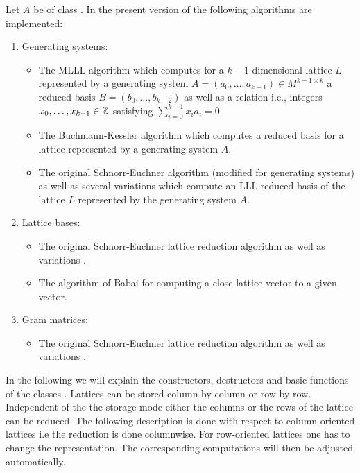 Let $A$ be of class .  In the present version of \LiDIA the following
algorithms are implemented:
\begin{enumerate}
\item Generating systems:
  \begin{itemize}
  \item The MLLL algorithm \cite{Pohst/Zassenhaus:1989} which computes for a $k-1$-dimensional
    lattice $L$ represented by a generating system $A = (a_0, \dots, a_{k-1}) \in M^{k-1 \times
      k}$ a reduced basis $B = (b_0, \dots, b_{k-2})$ as well as a relation i.e., integers $x_0,
    \dots , x_{k-1} \in \mathbb{Z}$ satisfying $\sum_{i=0}^{k-1} x_i a_i = 0$.
  \item The Buchmann-Kessler algorithm \cite{Buchmann/Kessler:1992} which computes a reduced
    basis for a lattice represented by a generating system $A$.
  \item The original Schnorr-Euchner algorithm \cite{Schnorr/Euchner:1994} (modified for
    generating systems) as well as several variations \cite{Wetzel/Backes:2000} which compute an
    LLL reduced basis of the lattice $L$ represented by the generating system $A$.
  \end{itemize}
\item Lattice bases:
  \begin{itemize}
  \item The original Schnorr-Euchner lattice reduction algorithm \cite{Schnorr/Euchner:1994} as
    well as variations \cite{Wetzel/Backes:2000}.
  \item The algorithm of Babai \cite{Babai:1986} for computing a close lattice vector to a given
    vector.
  \end{itemize}
\item Gram matrices:
  \begin{itemize}
  \item The original Schnorr-Euchner lattice reduction algorithm \cite{Schnorr/Euchner:1994} as
    well as variations \cite{Wetzel/Backes:2000}.
  \end{itemize}
\end{enumerate}
In the following we will explain the constructors, destructors and basic functions of the
classes .  Lattices can be stored column by column or row by row.
Independent of the the storage mode either the columns or the rows of the lattice can be
reduced.  The following description is done with respect to column-oriented lattices i.e the
reduction is done columnwise.  For row-oriented lattices one has to change the representation.
The corresponding computations will then be adjusted automatically.


